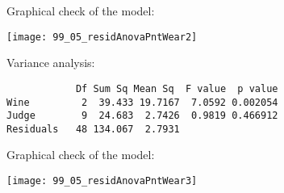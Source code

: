 \begin{frame}
   Graphical check of the model:\\
  \vspace{.1cm}
  \begin{center}
    \texttt{[image: 99\_05\_residAnovaPntWear2]}
    \end{center}
\end{frame}

\begin{frame}[fragile]
  \vspace{0.25cm}
  Variance analysis:
  \begin{verbatim}
            Df Sum Sq Mean Sq  F value  p value   
Wine         2  39.433 19.7167  7.0592 0.002054
Judge        9  24.683  2.7426  0.9819 0.466912   
Residuals   48 134.067  2.7931    
  \end{verbatim}
\end{frame}

\begin{frame}
   Graphical check of the model:\\
  \vspace{.1cm}
  \begin{center}
    \texttt{[image: 99\_05\_residAnovaPntWear3]}
    \end{center}
\end{frame}


